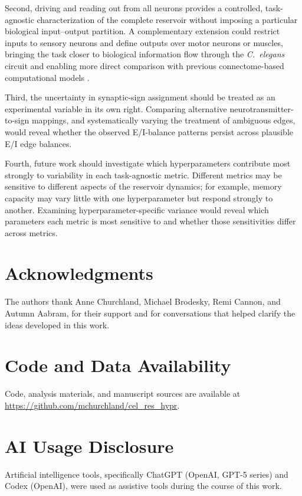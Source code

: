 \documentclass[a4paper,fleqn]{style_neural_networks/cas-dc}
\let\parencite\citep
\begin{document}
Second, driving and reading out from all neurons provides a controlled, task-agnostic characterization of the complete reservoir without imposing a particular biological input--output partition. A complementary extension could restrict inputs to sensory neurons and define outputs over motor neurons or muscles, bringing the task closer to biological information flow through the \textit{C.\ elegans} circuit and enabling more direct comparison with previous connectome-based computational models \parencite{KAWAI201915,yu_bpu_2025}.

Third, the uncertainty in synaptic-sign assignment should be treated as an experimental variable in its own right. Comparing alternative neurotransmitter-to-sign mappings, and systematically varying the treatment of ambiguous edges, would reveal whether the observed E/I-balance patterns persist across plausible E/I edge balances.

Fourth, future work should investigate which hyperparameters contribute most strongly to variability in each task-agnostic metric. Different metrics may be sensitive to different aspects of the reservoir dynamics; for example, memory capacity may vary little with one hyperparameter but respond strongly to another. Examining hyperparameter-specific variance would reveal which parameters each metric is most sensitive to and whether those sensitivities differ across metrics.

\section*{Acknowledgments}
The authors thank Anne Churchland, Michael Brodesky, Remi Cannon, and Autumn Aabram, for their support and for conversations that helped clarify the ideas developed in this work.

\section*{Code and Data Availability}

Code, analysis materials, and manuscript sources are available at \url{https://github.com/mchurchland/cel_res_hypr}.

\section*{AI Usage Disclosure}

Artificial intelligence tools, specifically ChatGPT (OpenAI, GPT-5 series) and Codex (OpenAI), were used as assistive tools during the course of this work.
\end{document}
